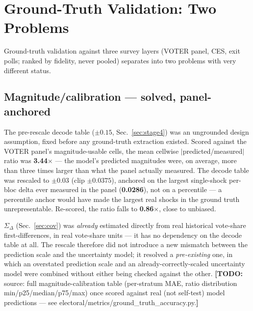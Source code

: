 \documentclass[11pt]{article}
\newcommand{\todo}[1]{{\color{red}\textbf{[TODO:} #1\textbf{]}}}
\begin{document}
\section{Ground-Truth Validation: Two Problems}\label{sec:validation}
Ground-truth validation against three survey layers (VOTER panel, CES,
exit polls; ranked by fidelity, never pooled) separates into two problems
with very different status.

\subsection{Magnitude/calibration --- solved, panel-anchored}
The pre-rescale decode table ($\pm0.15$, Sec.~\ref{sec:stage4})
was an ungrounded design assumption, fixed before any ground-truth
extraction existed. Scored against the VOTER panel's magnitude-usable cells,
the mean cellwise $|$predicted/measured$|$ ratio was \textbf{3.44$\times$}
--- the model's predicted magnitudes were, on average, more than three times
larger than what the panel actually measured. The decode table was rescaled
to $\pm0.03$ (clip $\pm0.0375$), anchored on the largest single-shock
per-bloc delta ever measured in the panel (\textbf{0.0286}), not on a
percentile --- a percentile anchor would have made the largest real shocks
in the ground truth unrepresentable. Re-scored, the ratio falls to
\textbf{0.86$\times$}, close to unbiased.

$\Sigma_\Delta$ (Sec.~\ref{sec:cov}) was \emph{already} estimated directly
from real historical vote-share first-differences, in real vote-share units
--- it has no dependency on the decode table at all. The rescale therefore
did not introduce a new mismatch between the prediction scale and the
uncertainty model; it resolved a \emph{pre-existing} one, in which an
overstated prediction scale and an already-correctly-scaled uncertainty
model were combined without either being checked against the other.
\todo{source: full magnitude-calibration table (per-stratum MAE, ratio
distribution min/p25/median/p75/max) once scored against real (not
self-test) model predictions --- see
electoral/metrics/ground\_truth\_accuracy.py.}
\end{document}
